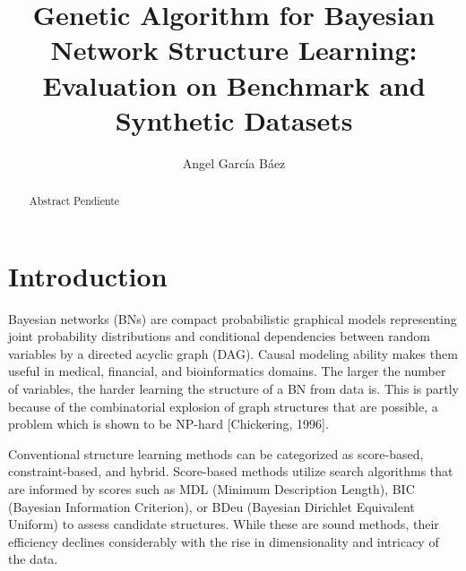 \documentclass[runningheads]{llncs}
\begin{document}
%
\title{Genetic Algorithm for Bayesian Network Structure Learning: Evaluation on Benchmark and Synthetic Datasets}

%
\author{Angel García Báez }
%
%
%
\maketitle              %
%
\begin{abstract}
Abstract Pendiente
\end{abstract}

%
%
%
\section{Introduction}

Bayesian networks (BNs) are compact probabilistic graphical models representing joint probability distributions and conditional dependencies between random variables by a directed acyclic graph (DAG). Causal modeling ability makes them useful in medical, financial, and bioinformatics domains. The larger the number of variables, the harder learning the structure of a BN from data is. This is partly because of the combinatorial explosion of graph structures that are possible, a problem which is shown to be NP-hard [Chickering, 1996].

Conventional structure learning methods can be categorized as score-based, constraint-based, and hybrid. Score-based methods utilize search algorithms that are informed by scores such as MDL (Minimum Description Length), BIC (Bayesian Information Criterion), or BDeu (Bayesian Dirichlet Equivalent Uniform) to assess candidate structures. While these are sound methods, their efficiency declines considerably with the rise in dimensionality and intricacy of the data.
\end{document}
